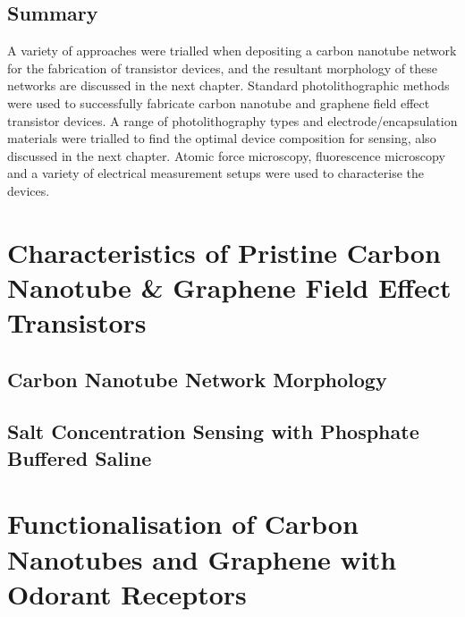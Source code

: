 \documentclass[
  a4paper,
]{scrbook}
\begin{document}
\hypertarget{summary}{%
\section{Summary}\label{summary}}

A variety of approaches were trialled when depositing a carbon nanotube
network for the fabrication of transistor devices, and the resultant
morphology of these networks are discussed in the next chapter. Standard
photolithographic methods were used to successfully fabricate carbon
nanotube and graphene field effect transistor devices. A range of
photolithography types and electrode/encapsulation materials were
trialled to find the optimal device composition for sensing, also
discussed in the next chapter. Atomic force microscopy, fluorescence
microscopy and a variety of electrical measurement setups were used to
characterise the devices.


\hypertarget{characteristics-of-pristine-carbon-nanotube-graphene-field-effect-transistors}{%
\chapter{Characteristics of Pristine Carbon Nanotube \& Graphene Field
Effect
Transistors}\label{characteristics-of-pristine-carbon-nanotube-graphene-field-effect-transistors}}

\hypertarget{carbon-nanotube-network-morphology}{%
\section{Carbon Nanotube Network
Morphology}\label{carbon-nanotube-network-morphology}}

\hypertarget{sec-dummy-sensing}{%
\section{Salt Concentration Sensing with Phosphate Buffered
Saline}\label{sec-dummy-sensing}}


\hypertarget{functionalisation-of-carbon-nanotubes-and-graphene-with-odorant-receptors}{%
\chapter{Functionalisation of Carbon Nanotubes and Graphene with Odorant
Receptors}\label{functionalisation-of-carbon-nanotubes-and-graphene-with-odorant-receptors}}
\end{document}
